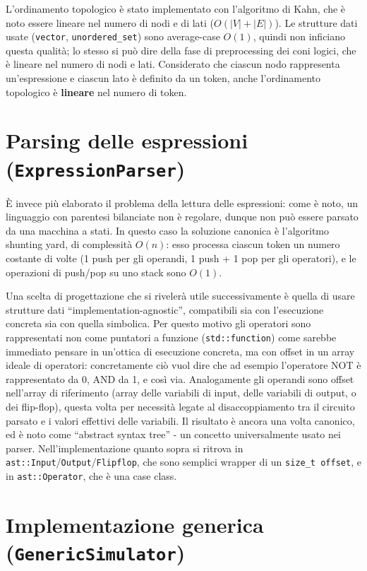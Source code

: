 \documentclass[12pt]{article}
\begin{document}
L'ordinamento topologico è stato implementato con l'algoritmo di Kahn,
che è noto essere lineare nel numero di nodi e di lati
(\(O(|V| + |E|)\)). Le strutture dati usate (\texttt{vector},
\texttt{unordered\_set}) sono average-case \(O(1)\), quindi non
inficiano questa qualità; lo stesso si può dire della fase di
preprocessing dei coni logici, che è lineare nel numero di nodi e lati.
Considerato che ciascun nodo rappresenta un'espressione e ciascun lato è
definito da un token, anche l'ordinamento topologico è \textbf{lineare}
nel numero di token.

\section{Parsing delle espressioni (\texttt{ExpressionParser})}

È invece più elaborato il problema della lettura delle espressioni: come
è noto, un linguaggio con parentesi bilanciate non è regolare, dunque
non può essere parsato da una macchina a stati. In questo caso la
soluzione canonica è l'algoritmo shunting yard, di complessità \(O(n)\):
esso processa ciascun token un numero costante di volte (1 push per gli
operandi, 1 push + 1 pop per gli operatori), e le operazioni di push/pop
su uno stack sono \(O(1)\).

Una scelta di progettazione che si rivelerà utile successivamente è
quella di usare strutture dati ``implementation-agnostic'', compatibili
sia con l'esecuzione concreta sia con quella simbolica. Per questo
motivo gli operatori sono rappresentati non come puntatori a funzione
(\texttt{std::function}) come sarebbe immediato pensare in un'ottica di
esecuzione concreta, ma con offset in un array ideale di operatori:
concretamente ciò vuol dire che ad esempio l'operatore NOT è
rappresentato da 0, AND da 1, e così via. Analogamente gli operandi sono
offset nell'array di riferimento (array delle variabili di input, delle
variabili di output, o dei flip-flop), questa volta per necessità legate
al disaccoppiamento tra il circuito parsato e i valori effettivi delle
variabili. Il risultato è ancora una volta canonico, ed è noto come
``abstract syntax tree'' - un concetto universalmente usato nei parser.
Nell'implementazione quanto sopra si ritrova in
\texttt{ast::Input}/\texttt{Output}/\texttt{Flipflop}, che sono semplici
wrapper di un \texttt{size\_t\ offset}, e in \texttt{ast::Operator}, che
è una case class.

\section{Implementazione generica (\texttt{GenericSimulator})}
\end{document}
